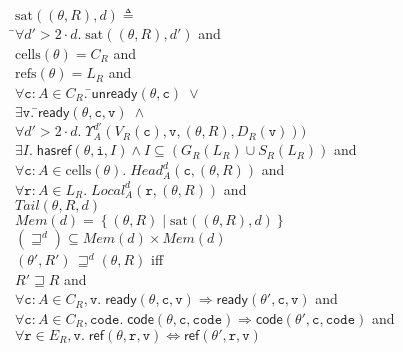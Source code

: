 \documentclass[preprint]{sigplanconf}
\newcommand{\setof}[1]{\left\{{#1}\right\}}
\newcommand{\comprehend}[2]{\setof{{#1}\;|\;{#2}}}
\newcommand{\betterstate}[3]{{#2}\, {\sqsupseteq}^{#1} {#3}}
\newcommand{\ready}[3]{\mathsf{ready}({#1}, {#2}, {#3})}
\newcommand{\unready}[2]{\mathsf{unready}({#1}, {#2})}
\newcommand{\cells}[1]{\mathrm{cells}({#1})}
\newcommand{\refs}[1]{\mathrm{refs}({#1})}
\newcommand{\hasref}[3]{\mathsf{hasref}({#1}, {#2}, {#3})}
\renewcommand{\implies}{\Rightarrow}
\newcommand{\term}[1]{\ensuremath{\mathtt{{#1}}}}
\newcommand{\Head}{\mathit{Head}}
\newcommand{\Tail}{\mathit{Tail}}
\newcommand{\Local}{\mathit{Local}}
\newcommand{\Mem}[1]{\mathit{Mem}(#1)}
\newcommand{\satisfy}[2]{\mathrm{sat}({#1},{#2})}
\begin{document}
\begin{figure}
\begin{tabbing}
$\satisfy{(\theta,R)}{d} \triangleq$ \\
\;\;\=$\forall d' > 2 \cdot d.\; \satisfy{(\theta,R)}{d'}$ and \\
    \>$\cells{\theta} = C_R$ and \\
    \>$\refs{\theta} = L_R$ and \\
    \>$\forall \term{c}:A \in C_R.\;$\=$\unready{\theta}{\term{c}} \;\vee$ \\
    \>                               \>$\exists \term{v}.\; $\=$\ready{\theta}{\term{c}}{\term{v}} \;\land$ \\
    \>                               \>                     \>$\forall d' > 2\cdot d.\;\Upsilon^{d'}_A(V_R(\term{c}),\term{v}, (\theta,R), D_R(\term{v})))$\\
    \>$\exists I.\;\hasref{\theta}{\term{i}}{I} \land I \subseteq (G_R(L_R) \cup S_R(L_R))$ and \\
    \>$\forall \term{c}:A \in \cells{\theta}.\;\Head^d_A(\term{c}, (\theta, R))$ and \\
    \>$\forall \term{r}:A \in L_R.\; \Local^d_A(\term{r}, (\theta, R))$ and \\
    \>$\Tail(\theta, R, d)$
\\[1em]

$\Mem{d} = \comprehend{(\theta,R)}{\satisfy{(\theta,R)}{d}}$ 
\\[1em]

$(\sqsupseteq^d) \subseteq \Mem{d} \times \Mem{d}$ \\[0.2em]

$\betterstate{d}{(\theta',R')}{(\theta,R)}$ iff \\
\> $R' \sqsupseteq R$ and \\
\> $\forall \term{c}:A \in C_R, \term{v}.\; \ready{\theta}{\term{c}}{\term{v}} \implies \ready{\theta'}{\term{c}}{\term{v}}$ and \\
\> $\forall \term{c}:A \in C_R, \term{code}.\; \mathsf{code}(\theta, \term{c}, \term{code}) \implies \mathsf{code}(\theta', \term{c}, \term{code})$ and \\
\> $\forall \term{r}\in E_R, \term{v}.\; \mathsf{ref}(\theta, \term{r}, \term{v}) \iff 
                                         \mathsf{ref}(\theta', \term{r}, \term{v}) $

\\[1em]


\end{tabbing}
\end{figure}
\end{document}
